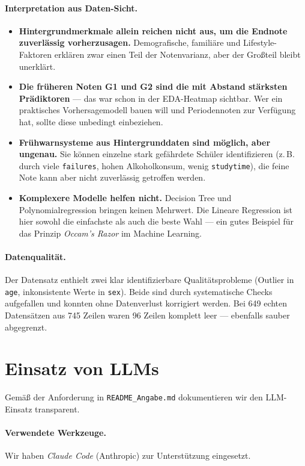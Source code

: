 \documentclass[11pt,a4paper]{article}
\begin{document}
\paragraph{Interpretation aus Daten-Sicht.}
\begin{itemize}
    \item \textbf{Hintergrundmerkmale allein reichen nicht aus, um die Endnote zuverlässig vorherzusagen.} Demografische, familiäre und Lifestyle-Faktoren erklären zwar einen Teil der Notenvarianz, aber der Großteil bleibt unerklärt.
    \item \textbf{Die früheren Noten G1 und G2 sind die mit Abstand stärksten Prädiktoren} --- das war schon in der EDA-Heatmap sichtbar. Wer ein praktisches Vorhersagemodell bauen will und Periodennoten zur Verfügung hat, sollte diese unbedingt einbeziehen.
    \item \textbf{Frühwarnsysteme aus Hintergrunddaten sind möglich, aber ungenau.} Sie können einzelne stark gefährdete Schüler identifizieren (z.\,B. durch viele \texttt{failures}, hohen Alkoholkonsum, wenig \texttt{studytime}), die feine Note kann aber nicht zuverlässig getroffen werden.
    \item \textbf{Komplexere Modelle helfen nicht.} Decision Tree und Polynomialregression bringen keinen Mehrwert. Die Lineare Regression ist hier sowohl die einfachste als auch die beste Wahl --- ein gutes Beispiel für das Prinzip \emph{Occam's Razor} im Machine Learning.
\end{itemize}

\paragraph{Datenqualität.} Der Datensatz enthielt zwei klar identifizierbare Qualitätsprobleme (Outlier in \texttt{age}, inkonsistente Werte in \texttt{sex}). Beide sind durch systematische Checks aufgefallen und konnten ohne Datenverlust korrigiert werden. Bei 649 echten Datensätzen aus 745 Zeilen waren 96 Zeilen komplett leer --- ebenfalls sauber abgegrenzt.

\section{Einsatz von LLMs}

Gemäß der Anforderung in \texttt{README\_Angabe.md} dokumentieren wir den LLM-Einsatz transparent.

\paragraph{Verwendete Werkzeuge.} Wir haben \emph{Claude Code} (Anthropic) zur Unterstützung eingesetzt.
\end{document}
